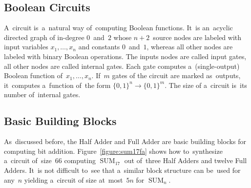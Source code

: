 \documentclass[sigconf, review, anonymous]{acmart}
\DeclareMathOperator{\SUM}{SUM}
\begin{document}


\subsection{Boolean Circuits}
A~circuit is~a~natural way of~computing Boolean functions.
It~is an~acyclic directed graph of in-degree $0$~and~$2$ whose $n+2$~source
nodes are labeled with input variables
$x_1, \dotsc, x_n$ and constants $0$~and~$1$, whereas all other nodes
are labeled with binary Boolean operations.
The inputs nodes are called input gates, all other nodes are called internal gates.
Each gate computes
a~(single-output) Boolean function of~$x_1, \dotsc, x_n$. If~$m$ gates of the
circuit are marked as~outputs, it~computes a~function of~the form $\{0,1\}^n \to \{0,1\}^m$.
The size of a~circuit is~its number of~internal gates.

\subsection{Basic Building Blocks}
As~discussed before, the Half Adder and Full Adder are basic building
blocks for computing bit addition. Figure~\ref{figure:sum17fa}
shows how to~synthesize a~circuit of~size~$66$ computing $\SUM_{17}$
out of~three Half Adders and twelve Full Adders.
It~is not difficult to~see that a~similar block structure can
be~used for any~$n$ yielding a~circuit of size at~most~$5n$ for $\SUM_n$.
\end{document}
